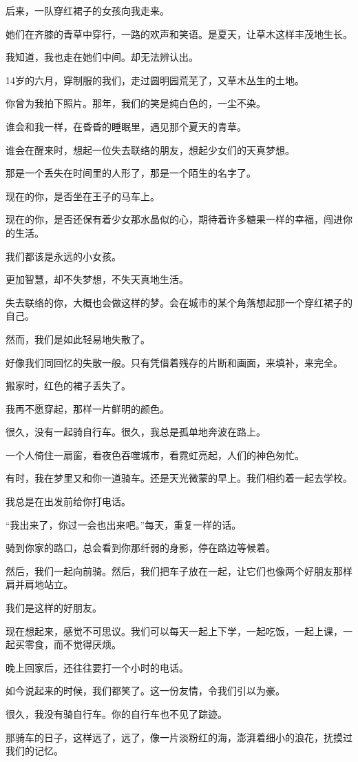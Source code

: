 		后来，一队穿红裙子的女孩向我走来。\par
		她们在齐膝的青草中穿行，一路的欢声和笑语。是夏天，让草木这样丰茂地生长。\par
		我知道，我也走在她们中间。却无法辨认出。\par
		14岁的六月，穿制服的我们，走过圆明园荒芜了，又草木丛生的土地。\par
		你曾为我拍下照片。那年，我们的笑是纯白色的，一尘不染。\par
		谁会和我一样，在昏昏的睡眠里，遇见那个夏天的青草。\par
		谁会在醒来时，想起一位失去联络的朋友，想起少女们的天真梦想。\par
		那是一个丢失在时间里的人形了，那是一个陌生的名字了。\par
		现在的你，是否坐在王子的马车上。\par
		现在的你，是否还保有着少女那水晶似的心，期待着许多糖果一样的幸福，闯进你的生活。\par
		我们都该是永远的小女孩。\par
		更加智慧，却不失梦想，不失天真地生活。\par
		失去联络的你，大概也会做这样的梦。会在城市的某个角落想起那一个穿红裙子的自己。\par
		然而，我们是如此轻易地失散了。\par
		好像我们同回忆的失散一般。只有凭借着残存的片断和画面，来填补，来完全。\par
		搬家时，红色的裙子丢失了。\par
		我再不愿穿起，那样一片鲜明的颜色。

		很久，没有一起骑自行车。很久，我总是孤单地奔波在路上。\par
		一个人倚住一扇窗，看夜色吞噬城市，看霓虹亮起，人们的神色匆忙。\par
		有时，我在梦里又和你一道骑车。还是天光微蒙的早上。我们相约着一起去学校。\par
		我总是在出发前给你打电话。\par
		“我出来了，你过一会也出来吧。”每天，重复一样的话。\par
		骑到你家的路口，总会看到你那纤弱的身影，停在路边等候着。\par
		然后，我们一起向前骑。然后，我们把车子放在一起，让它们也像两个好朋友那样肩并肩地站立。\par
		我们是这样的好朋友。\par
		现在想起来，感觉不可思议。我们可以每天一起上下学，一起吃饭，一起上课，一起买零食，而不觉得厌烦。\par
		晚上回家后，还往往要打一个小时的电话。\par
		如今说起来的时候，我们都笑了。这一份友情，令我们引以为豪。\par
		很久，我没有骑自行车。你的自行车也不见了踪迹。\par
		那骑车的日子，这样远了，远了，像一片淡粉红的海，澎湃着细小的浪花，抚摸过我们的记忆。

